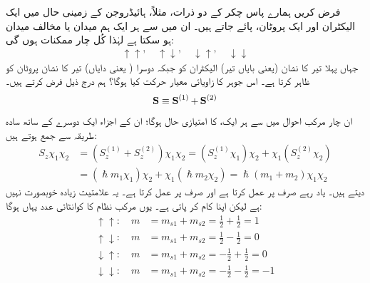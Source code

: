 فرض کریں ہمارے پاس  چکر کے دو ذرات، مثلاً، ہائیڈروجن کے زمینی حال میں ایک الیکٹران اور ایک پروٹان، پائے جاتے ہیں۔ ان میں سے ہر ایک ہم میدان یا مخالف میدان ہو سکتا ہے لہٰذا کُل چار ممکنات ہوں گی:
\begin{align}
\uparrow \uparrow, \quad \uparrow \downarrow, \quad \downarrow \uparrow, \quad \downarrow \downarrow
\end{align}
جہاں پہلا تیر کا نشان (یعنی بایاں تیر) الیکٹران کو جبکہ دوسرا ( یعنی دایاں) تیر کا نشان پروٹان کو ظاہر کرتا ہے۔  اس جوہر کا  زاویائی معیار حرکت کیا ہوگا؟ ہم درج ذیل فرض کرتے ہیں۔ 
\begin{align} 
\operatorname{\mathbf{S}} \equiv \operatorname{\mathbf{S}}^{(1)} + \operatorname{\mathbf{S}}^{(2)}
\end{align}
ان چار مرکب احوال میں سے ہر ایک،  کا امتیازی حال ہوگا؛ ان کے  اجزاء ایک دوسرے کے ساتھ سادہ طریقہ سے جمع ہوتے ہیں:
\begin{align*}
S_z \chi_1 \chi_2 &= (S_z^{(1)} + S_z^{(2)} ) \chi_1 \chi_2 = (S_z^{(1)} \chi_1) \chi_2 + \chi_1 (S_z^{(2)} \chi_2) \\
&= (\hslash m_1 \chi_1) \chi_2 + \chi_1 (\hslash m_2 \chi_2) = \hslash (m_1 + m_2) \chi_1 \chi_2
\end{align*}
 دیتے ہیں۔ یاد رہے  صرف  پر عمل کرتا ہے اور  صرف  پر عمل کرتا ہے۔ یہ علامتیت زیادہ خوبصورت نہیں ہے لیکن اپنا کام کر پاتی ہے۔ یوں مرکب نظام کا کوانٹائی عدد  یہاں  ہوگا:
\begin{align*}
\uparrow \uparrow: \quad m &= m_{s1} + m_{s2} = \frac{1}{2} + \frac{1}{2} = 1 \\
\uparrow \downarrow: \quad m &= m_{s1} + m_{s2} = \frac{1}{2} -\frac{1}{2} = 0 \\
\downarrow \uparrow: \quad m &= m_{s1} + m_{s2} = -\frac{1}{2} + \frac{1}{2} = 0 \\
\downarrow \downarrow: \quad m &= m_{s1} + m_{s2} = -\frac{1}{2} - \frac{1}{2} = -1 
\end{align*} 

